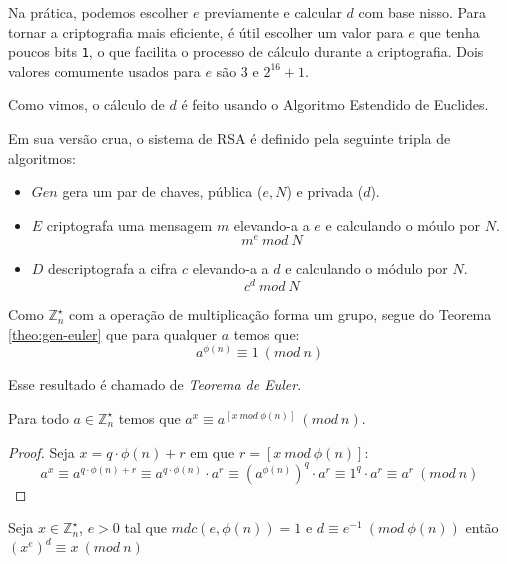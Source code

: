 Na prática, podemos escolher $e$ previamente e calcular $d$ com base nisso.
Para tornar a criptografia mais eficiente, é útil escolher um valor para $e$ que tenha poucos bits {\tt 1}, o que facilita o processo de cálculo durante a criptografia.
Dois valores comumente usados para $e$ são $3$ e $2^{16} + 1$.

Como vimos, o cálculo de $d$ é feito usando o Algoritmo Estendido de Euclides.



Em sua versão crua, o sistema de RSA é definido pela seguinte tripla de algoritmos:

\begin{itemize}
\item[] $Gen$ gera um par de chaves, pública ($e, N$) e privada ($d$).
\item[] $E$ criptografa uma mensagem $m$ elevando-a a $e$ e calculando o móulo por $N$.
  \begin{displaymath}
    m^e\ mod\ N
  \end{displaymath}
\item[] $D$ descriptografa a cifra $c$ elevando-a a $d$ e calculando o módulo por $N$.
  \begin{displaymath}
    c^d\ mod\ N
  \end{displaymath}
\end{itemize}

Como $\mathbb{Z}_n^\star$ com a operação de multiplicação forma um grupo, segue do Teorema \ref{theo:gen-euler} que para qualquer $a$ temos que:
\begin{displaymath}
  a^{\phi(n)} \equiv 1\ (mod\ n)
\end{displaymath}

Esse resultado é chamado de {\em Teorema de Euler}.

\begin{corollary}
  Para todo $a \in \mathbb{Z}_n^\star$ temos que $a^x \equiv a^{[x\ mod\ \phi(n)]}\ (mod\ n)$.
\end{corollary}
\begin{proof}
  Seja $x = q \cdot \phi(n) + r$ em que $r = [x\ mod\ \phi(n)]$:
  \begin{displaymath}
    a^x \equiv a^{q \cdot \phi(n) + r} \equiv a^{q \cdot \phi(n)} \cdot a^r \equiv (a^{\phi(n)})^q \cdot a^r \equiv 1^q \cdot a^r \equiv a^r\ (mod\ n)
  \end{displaymath}
\end{proof}


\begin{corollary}
\label{cor:euler}
Seja $x \in \mathbb{Z}_n^\star$, $e > 0$ tal que $mdc(e, \phi(n)) = 1$ e $d \equiv e^{-1}\ (mod\ \phi(n))$ então $(x^e)^d \equiv x\ (mod\ n)$
\end{corollary}

